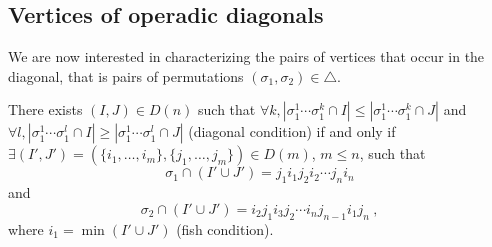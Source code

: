 
\subsection{Vertices of operadic diagonals}

We are now interested in characterizing the pairs of vertices that occur in the diagonal, that is pairs of permutations $(\sigma_1,\sigma_2) \in \triangle$. 

\begin{theorem} There exists $(I,J) \in D(n)$ such that $\forall k, |\sigma_1^1\cdots\sigma_1^k \cap I| \leq |\sigma_1^1\cdots\sigma_1^k \cap J|$ and $\forall l, |\sigma_1^1\cdots\sigma_1^l \cap I| \geq |\sigma_1^1\cdots\sigma_1^l \cap J|$ (diagonal condition) if and only if $\exists (I',J')=(\{i_1,\ldots,i_m\},\{j_1,\ldots,j_m\}) \in D(m)$, $m\leq n$, such that \[\sigma_1 \cap (I'\cup J')=j_1 i_1 j_2 i_2 \cdots j_n i_n \] and \[ \sigma_2 \cap (I'\cup J') = i_2 j_1 i_3 j_2 \cdots i_n j_{n-1} i_1 j_n \ , \] where $i_1 = \min (I' \cup J')$ (fish condition). 
\end{theorem}

